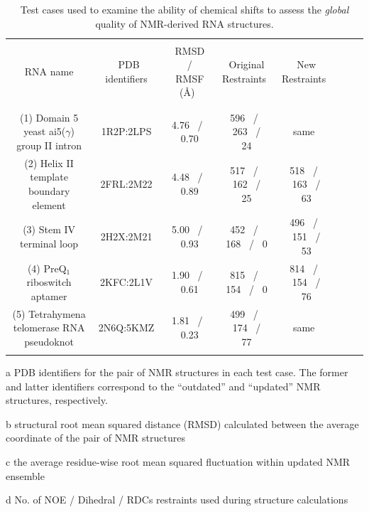 \documentclass[fleqn,10pt]{wlscirep}
\begin{document}
\begin{table}[h]
\centering
\begin{threeparttable}
\begin{tabular}{c c c c c c c c }
\hline
\\
RNA name & \tnote{a} \ PDB identifiers & \tnote{b} \ RMSD \ / \tnote{c} \ RMSF (\AA)  &  \tnote{d} \ Original Restraints & \tnote{d} \ New Restraints \\
\\
\hline
\\
(1) Domain 5 yeast ai5($\gamma$) group II intron & 1R2P:2LPS & 4.76  \ / \ 0.70 & 596 \ / \ 263 \ / \ 24 & same \\
(2) Helix II template boundary element & 2FRL:2M22 & 4.48  \ / \ 0.89& 517 \ / \ 162 \ / \ 25 & 518 \ / \ 163 \ / \ 63  \\
(3) Stem IV terminal loop & 2H2X:2M21 & 5.00 \ / \ 0.93& 452 \ / \ 168 \ / \ 0 & 496 \ / \ 151 \ / \ 53    \\
(4) PreQ$_{1}$ riboswitch aptamer & 2KFC:2L1V & 1.90 \ / \ 0.61& 815 \ / \ 154 \ / \ 0 & 814 \ / \ 154 \ / \ 76   \\
(5) Tetrahymena telomerase RNA pseudoknot  & 2N6Q:5KMZ & 1.81 \ / \ 0.23 & 499 \ / \ 174 \ / \ 77  & same  \\
\\
\hline
\end{tabular}
\begin{tablenotes}
\item[a] PDB identifiers for the pair of NMR structures in each test case. The former and latter identifiers correspond to the ``outdated'' and ``updated'' NMR structures, respectively.
\item[b] structural root mean squared distance (RMSD) calculated between the average coordinate of the pair of NMR structures
\item[c] the average residue-wise root mean squared fluctuation within updated NMR ensemble
\item[d] No. of NOE / Dihedral / RDCs restraints used during structure calculations

\end{tablenotes}
\end{threeparttable}
\caption{\label{tab:testcases} Test cases used to examine the ability of chemical shifts to assess the \textit{global} quality of NMR-derived RNA structures.}
\end{table}
\end{document}
